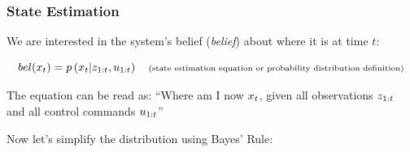    \begin{frame}
    \frametitle{State Estimation}
    
    We are interested in the system's belief (\emph{belief}) about where it is at time $t$:
    
    \begin{equation*}
    bel(x_{t}) = p\left(x_{t} | z_{1:t}, u_{1:t} \right) \quad \text{\scriptsize (state estimation equation or probability distribution definition)}
    \end{equation*}
    
    The equation can be read as: ``Where am I now $x_{t}$, given all observations $z_{1:t}$ and all control commands $u_{1:t}$''
    
    \vspace{1cm}
    
    Now let's simplify the distribution using Bayes' Rule:
    
    \end{frame}


